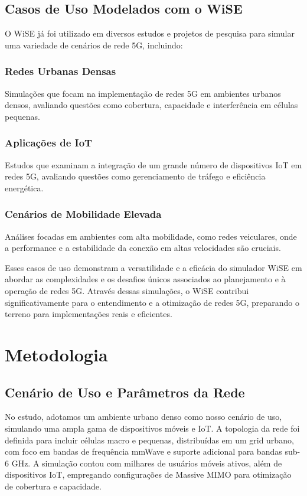 \documentclass[journal]{IEEEtran}
\begin{document}
\subsection{Casos de Uso Modelados com o WiSE}

O WiSE já foi utilizado em diversos estudos e projetos de pesquisa para simular uma variedade de cenários de rede 5G, incluindo:

\subsubsection{Redes Urbanas Densas} Simulações que focam na implementação de redes 5G em ambientes urbanos densos, avaliando questões como cobertura, capacidade e interferência em células pequenas.

\subsubsection{Aplicações de IoT} Estudos que examinam a integração de um grande número de dispositivos IoT em redes 5G, avaliando questões como gerenciamento de tráfego e eficiência energética.

\subsubsection{Cenários de Mobilidade Elevada} Análises focadas em ambientes com alta mobilidade, como redes veiculares, onde a performance e a estabilidade da conexão em altas velocidades são cruciais.

Esses casos de uso demonstram a versatilidade e a eficácia do simulador WiSE em abordar as complexidades e os desafios únicos associados ao planejamento e à operação de redes 5G. Através dessas simulações, o WiSE contribui significativamente para o entendimento e a otimização de redes 5G, preparando o terreno para implementações reais e eficientes.

\section{Metodologia}

\subsection{Cenário de Uso e Parâmetros da Rede}

No estudo, adotamos um ambiente urbano denso como nosso cenário de uso, simulando uma ampla gama de dispositivos móveis e IoT. A topologia da rede foi definida para incluir células macro e pequenas, distribuídas em um grid urbano, com foco em bandas de frequência mmWave e suporte adicional para bandas sub-6 GHz. A simulação contou com milhares de usuários móveis ativos, além de dispositivos IoT, empregando configurações de Massive MIMO para otimização de cobertura e capacidade.
\end{document}
